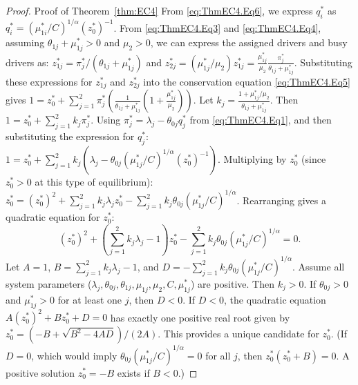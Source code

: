\begin{proof}{Proof of Theorem~\ref{thm:EC4}}
From \eqref{eq:ThmEC4.Eq6}, we express $q_i^*$ as $q_i^* = (\mu_{1i}^*/C)^{1/\alpha} (z_0^*)^{-1}$.
From \eqref{eq:ThmEC4.Eq3} and \eqref{eq:ThmEC4.Eq4}, assuming $\theta_{1j} + \mu_{1j}^* > 0$ and $\mu_2 > 0$, we can express the assigned drivers and busy drivers as: $z_{1j}^* = \pi_j^*/(\theta_{1j} + \mu_{1j}^*)$ and $z_{2j}^* = (\mu_{1j}^*/\mu_2)z_{1j}^* = \frac{\mu_{1j}^*}{\mu_2} \frac{\pi_j^*}{\theta_{1j} + \mu_{1j}^*}$.
Substituting these expressions for $z_{1j}^*$ and $z_{2j}^*$ into the conservation equation \eqref{eq:ThmEC4.Eq5} gives
$1 = z_0^* + \sum_{j=1}^{2} \pi_j^* \left( \frac{1}{\theta_{1j} + \mu_{1j}^*} (1 + \frac{\mu_{1j}^*}{\mu_2}) \right)$.
Let $k_j = \frac{1 + \mu_{1j}^*/\mu_2}{\theta_{1j} + \mu_{1j}^*}$. Then $1 = z_0^* + \sum_{j=1}^{2} k_j \pi_j^*$.
Using $\pi_j^* = \lambda_j - \theta_{0j}q_j^*$ from \eqref{eq:ThmEC4.Eq1}, and then substituting the expression for $q_j^*$:
$1 = z_0^* + \sum_{j=1}^{2} k_j \left( \lambda_j - \theta_{0j}(\mu_{1j}^*/C)^{1/\alpha} (z_0^*)^{-1} \right)$.
Multiplying by $z_0^*$ (since $z_0^* > 0$ at this type of equilibrium):
$z_0^* = (z_0^*)^2 + \sum_{j=1}^{2} k_j \lambda_j z_0^* - \sum_{j=1}^{2} k_j \theta_{0j}(\mu_{1j}^*/C)^{1/\alpha}$.
Rearranging gives a quadratic equation for $z_0^*$:
\begin{equation}
(z_0^*)^2 + \left( \sum_{j=1}^{2} k_j \lambda_j - 1 \right) z_0^* - \sum_{j=1}^{2} k_j \theta_{0j}(\mu_{1j}^*/C)^{1/\alpha} = 0. \label{eq:ThmEC4.Eq7}
\end{equation}
Let $A=1$, $B = \sum_{j=1}^{2} k_j \lambda_j - 1$, and $D = - \sum_{j=1}^{2} k_j \theta_{0j}(\mu_{1j}^*/C)^{1/\alpha}$.
Assume all system parameters ($\lambda_j, \theta_{0j}, \theta_{1j}, \mu_{1j}, \mu_2, C, \mu_{1j}^*$) are positive.
Then $k_j > 0$.
If $\theta_{0j} > 0$ and $\mu_{1j}^* > 0$ for at least one $j$, then $D < 0$.
If $D < 0$, the quadratic equation $A(z_0^*)^2 + B z_0^* + D = 0$ has exactly one positive real root given by $z_0^* = (-B + \sqrt{B^2 - 4AD})/(2A)$.
This provides a unique candidate for $z_0^*$.
(If $D=0$, which would imply $\theta_{0j}(\mu_{1j}^*/C)^{1/\alpha}=0$ for all $j$, then $z_0^*(z_0^*+B)=0$.
A positive solution $z_0^* = -B$ exists if $B<0$.)


\end{proof}
